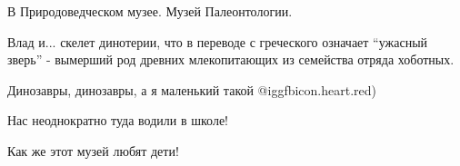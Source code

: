  
 
 
 
 


В Природоведческом музее. Музей Палеонтологии.

Влад и... скелет динотерии, что в переводе с греческого означает
\enquote{ужасный зверь} - вымерший род древних млекопитающих из семейства
отряда хоботных.

Динозавры, динозавры, а я маленький такой @igg{fbicon.heart.red})

Нас неоднократно туда водили в школе!

Как же этот музей любят дети!
